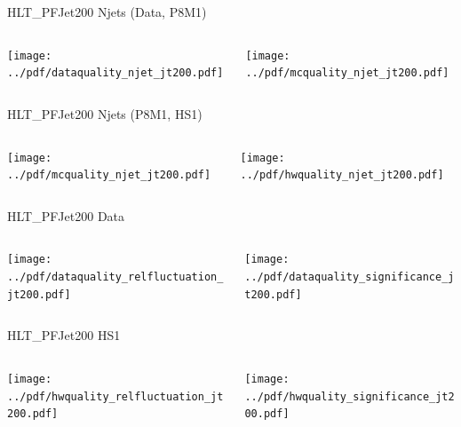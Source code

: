 \documentclass[9pt]{beamer}
\begin{document}
\begin{frame}[t]{HLT\_PFJet200 Njets (Data, P8M1)}
\begin{columns}[T]
  \begin{column}{.5\textwidth}
  \texttt{[image: ../pdf/dataquality\_njet\_jt200.pdf]}
  \end{column}
  \begin{column}{.5\textwidth}
  \texttt{[image: ../pdf/mcquality\_njet\_jt200.pdf]}
  \end{column}
\end{columns}
\end{frame}

\begin{frame}[t]{HLT\_PFJet200 Njets (P8M1, HS1)}
\begin{columns}[T]
  \begin{column}{.5\textwidth}
  \texttt{[image: ../pdf/mcquality\_njet\_jt200.pdf]}
  \end{column}
  \begin{column}{.5\textwidth}
  \texttt{[image: ../pdf/hwquality\_njet\_jt200.pdf]}
  \end{column}
\end{columns}
\end{frame}

\begin{frame}[t]{HLT\_PFJet200 Data}
\begin{columns}[T]
  \begin{column}{.5\textwidth}
  \texttt{[image: ../pdf/dataquality\_relfluctuation\_jt200.pdf]}
  \end{column}
  \begin{column}{.5\textwidth}
  \texttt{[image: ../pdf/dataquality\_significance\_jt200.pdf]}
  \end{column}
\end{columns}
\end{frame}

\begin{frame}[t]{HLT\_PFJet200 HS1}
\begin{columns}[T]
  \begin{column}{.5\textwidth}
  \texttt{[image: ../pdf/hwquality\_relfluctuation\_jt200.pdf]}
  \end{column}
  \begin{column}{.5\textwidth}
  \texttt{[image: ../pdf/hwquality\_significance\_jt200.pdf]}
  \end{column}
\end{columns}
\end{frame}
\end{document}
